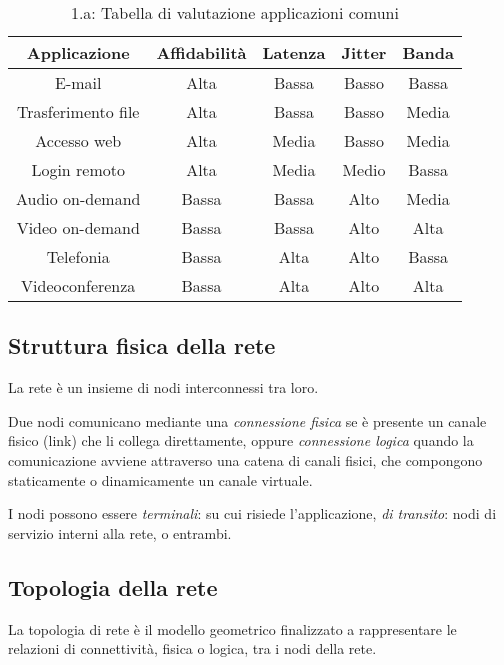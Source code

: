         \begin{table}[ht]
            \centering
            \begin{tabular}{|c|c|c|c|c|}
                \hline
                Applicazione & Affidabilità & Latenza & Jitter & Banda \\
                \hline
                E-mail & Alta & Bassa & Basso & Bassa \\
                \hline
                Trasferimento file & Alta & Bassa & Basso & Media \\
                \hline
                Accesso web & Alta & Media & Basso & Media \\
                \hline
                Login remoto & Alta & Media & Medio & Bassa \\
                \hline
                Audio on-demand & Bassa & Bassa & Alto & Media \\
                \hline
                Video on-demand & Bassa & Bassa & Alto & Alta \\
                \hline
                Telefonia & Bassa & Alta & Alto & Bassa \\
                \hline
                Videoconferenza & Bassa & Alta & Alto & Alta \\
                \hline
            \end{tabular}
            \caption*{1.a: Tabella di valutazione applicazioni comuni}
            \label{table:valutazione}
        \end{table}

    \subsection{Struttura fisica della rete}
        La rete è un insieme di nodi interconnessi tra loro.
        
        Due nodi comunicano mediante una \textit{connessione fisica} se è presente un canale fisico (link) che li collega direttamente, oppure \textit{connessione logica} quando la comunicazione avviene attraverso una catena di canali fisici, che compongono staticamente o dinamicamente un canale virtuale.

        I nodi possono essere \textit{terminali}: su cui risiede l'applicazione, \textit{di transito}: nodi di servizio interni alla rete, o entrambi.

    \subsection{Topologia della rete}
        La topologia di rete è il modello geometrico finalizzato a rappresentare le relazioni di connettività, fisica o logica, tra i nodi della rete.

